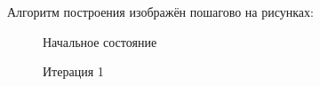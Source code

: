 \documentclass[12pt]{article}
\begin{document}
Алгоритм построения изображён пошагово на рисунках:
\begin{figure}[H]
    \centering
    \begin{minipage}{0.48\textwidth}
        \centering
        \caption{Начальное состояние}
    \end{minipage}
    \hfill
    \begin{minipage}{0.48\textwidth}
        \centering
        \caption{Итерация 1}
    \end{minipage}
\end{figure}
\end{document}

